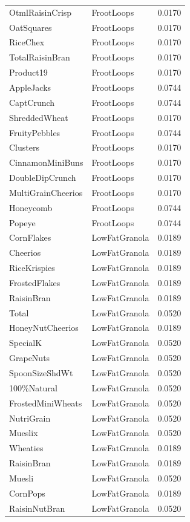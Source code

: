\begin{longtable}{llr}
OtmlRaisinCrisp & FrootLoops & 0.0170 \\
OatSquares & FrootLoops & 0.0170 \\
RiceChex & FrootLoops & 0.0170 \\
TotalRaisinBran & FrootLoops & 0.0170 \\
Product19 & FrootLoops & 0.0170 \\
AppleJacks & FrootLoops & 0.0744 \\
CaptCrunch & FrootLoops & 0.0744 \\
ShreddedWheat & FrootLoops & 0.0170 \\
FruityPebbles & FrootLoops & 0.0744 \\
Clusters & FrootLoops & 0.0170 \\
CinnamonMiniBuns & FrootLoops & 0.0170 \\
DoubleDipCrunch & FrootLoops & 0.0170 \\
MultiGrainCheerios & FrootLoops & 0.0170 \\
Honeycomb & FrootLoops & 0.0744 \\
Popeye & FrootLoops & 0.0744 \\
CornFlakes & LowFatGranola & 0.0189 \\
Cheerios & LowFatGranola & 0.0189 \\
RiceKrispies & LowFatGranola & 0.0189 \\
FrostedFlakes & LowFatGranola & 0.0189 \\
RaisinBran & LowFatGranola & 0.0189 \\
Total & LowFatGranola & 0.0520 \\
HoneyNutCheerios & LowFatGranola & 0.0189 \\
SpecialK & LowFatGranola & 0.0520 \\
GrapeNuts & LowFatGranola & 0.0520 \\
SpoonSizeShdWt & LowFatGranola & 0.0520 \\
100\%Natural & LowFatGranola & 0.0520 \\
FrostedMiniWheats & LowFatGranola & 0.0520 \\
NutriGrain & LowFatGranola & 0.0520 \\
Mueslix & LowFatGranola & 0.0520 \\
Wheaties & LowFatGranola & 0.0189 \\
RaisinBran & LowFatGranola & 0.0189 \\
Muesli & LowFatGranola & 0.0520 \\
CornPops & LowFatGranola & 0.0189 \\
RaisinNutBran & LowFatGranola & 0.0520 \\

\end{longtable}
